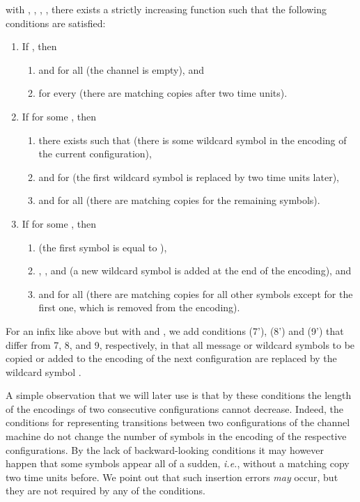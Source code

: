 \documentclass{CSML}
\theoremstyle{plain}\newtheorem{theorem}[thm]{Theorem}
\theoremstyle{plain}\newtheorem{corollary}[thm]{Corollary}
\theoremstyle{plain}\newtheorem{example}[thm]{Example}
\theoremstyle{plain}\newtheorem{lemma}[thm]{Lemma}
\theoremstyle{plain}\newtheorem{remark}[thm]{Remark}
\newcommand*\ie{\textit{i.e.}}
\begin{document}
with ,
,
,
,
there exists a strictly increasing function  such that the following conditions are satisfied:
\begin{enumerate}
	\addtocounter{enumi}{6} 
\item If ,
	then 
	\begin{enumerate}
	\item  and  for all  (the channel is empty), and
	\item  for every  (there are matching copies after two time units).
	\end{enumerate}	
\item If  for some , then
	\begin{enumerate}
	\item there exists  such that  (there is some wildcard symbol in the encoding of the current configuration),  
	\item  and  for  (the first wildcard symbol is replaced by  two time units later), 
	\item  and   for all  (there are matching copies for the remaining symbols).
	\end{enumerate}
\item If  for some , then 
	\begin{enumerate}
	\item  (the first symbol is equal to ),
	\item , , and 
		 (a new wildcard symbol is added at the end of the encoding), and
	\item  and   for all  (there are matching copies for all other symbols except for the first one, which is removed from the encoding). 
\end{enumerate}		
\end{enumerate}\smallskip

\noindent For an infix like above but with  and , we add conditions (7'), (8') and (9') that   differ from 7, 8, and 9, respectively, in that all message or wildcard symbols to be copied or added to the encoding of the next configuration are replaced by the wildcard symbol .

A simple observation that we will later use is that by these conditions the length of the encodings of two consecutive configurations cannot decrease. 
Indeed, the conditions for representing transitions between two configurations of the channel machine do not change the number of symbols in the encoding of the respective configurations. 
By the lack of backward-looking conditions it may however happen that some symbols appear all of a sudden, \ie, without a matching copy two time units before. We point out that such insertion errors \emph{may} occur, but they are not required by any of the conditions. 
\end{document}
